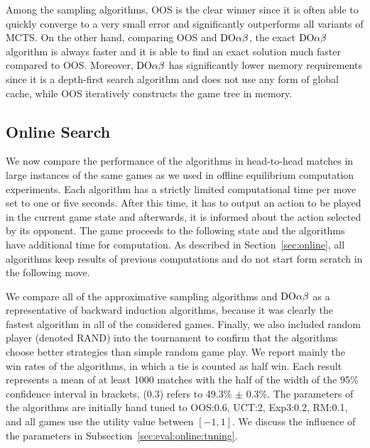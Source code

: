 Among the sampling algorithms, OOS is the clear winner since it is often able to quickly converge to a very small error and significantly outperforms all variants of MCTS.
On the other hand, comparing OOS and $\textrm{DO}\alpha\beta$, the exact $\textrm{DO}\alpha\beta$ algorithm is always faster and it is able to find an exact solution much faster compared to OOS.
Moreover, $\textrm{DO}\alpha\beta$ has significantly lower memory requirements since it is a depth-first search algorithm and does not use any form of global cache, while OOS iteratively constructs the game tree in memory.


\subsection{Online Search}

We now compare the performance of the algorithms in head-to-head matches in large instances of the same games as we used in offline equilibrium computation experiments. Each algorithm has a strictly limited computational time per move set to one or five seconds. After this time, it has to output an action to be played in the current game state and afterwards, it is informed about the action selected by its opponent. The game proceeds to the following state and the algorithms have additional time for computation. As described in Section~\ref{sec:online}, all algorithms keep results of previous computations and do not start form scratch in the following move. 

We compare all of the approximative sampling algorithms and $\textrm{DO}\alpha\beta$ as a representative of backward induction algorithms, because it was clearly the fastest algorithm in all of the considered games. 
Finally, we also included random player (denoted RAND) into the tournament to confirm that the algorithms choose better strategies than simple random game play.
We report mainly the win rates of the algorithms, in which a tie is counted as half win.
Each result represents a mean of at least 1000 matches with the half of the width of the 95\% confidence interval in brackets, (0.3) refers to 49.3\% $\pm$ 0.3\%. 
The parameters of the algorithms are initially hand tuned to OOS:0.6, UCT:2, Exp3:0.2, RM:0.1, and all games use the utility value between $[-1,1]$. 
We discuss the influence of the parameters in Subsection~\ref{sec:eval:online:tuning}.

